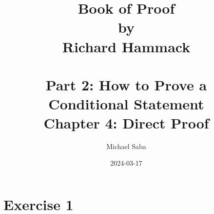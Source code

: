 \documentclass[12pt]{article}
\title{%
    \Huge Book of Proof \\
    \large by \\
    \Large Richard Hammack \\~\\
    \huge Part 2: How to Prove a Conditional Statement \\
    \LARGE Chapter 4: Direct Proof
}
\date{2024-03-17}
\author{Michael Saba}
\begin{document}
    \maketitle
    \newpage

    \section*{Exercise 1}
    
        
\end{document}
